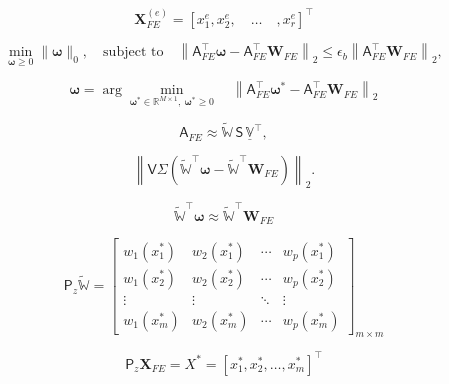 \documentclass[11pt]{article}
\renewcommand{\vec}[1]{\mathbf{#1}}
\newcommand{\mat}[1]{\mathsf{#1}}
\begin{document}
\begin{equation}
\vec{X}_{FE}^{(e)} = \left[ x_1^e, x_2^e, \quad\hdots\quad, x_r^e \right]^\top
\end{equation}

\begin{equation}
\min_{\boldsymbol{\omega} \geq 0} \| \boldsymbol{\omega} \|_0, \quad \text{subject to} \quad \left\| \mat{A}_{FE}^\top \boldsymbol{\omega} - \mat{A}_{FE}^\top \vec{W}_{FE} \right\|_2 \leq \epsilon_b \left\| \mat{A}_{FE}^\top \vec{W}_{FE} \right\|_2,
\label{eq:ecm_opt2}
\end{equation}

\begin{equation}
\boldsymbol{\omega} = \arg \min_{\boldsymbol{\omega^*} \in \mathbb{R}^{M\times 1},\ \boldsymbol{\omega^*} \geq 0} \quad \left\| \mat{A}_{FE}^\top \boldsymbol{\omega^*} - \mat{A}_{FE}^\top \vec{W}_{FE} \right\|_2 
\label{eq:alternative_min_ecm}
\end{equation}

\begin{equation}
\mat{A}_{FE} \approx \widetilde{\mathbb{W}}\, \mat{S}\, \underline{\mathbb{V}}^{\top},
\end{equation}

\begin{equation}
\left\| \mat{V} \mat{\Sigma} \left( \widetilde{\mathbb{W}}^{\top} \boldsymbol{\omega} - \widetilde{\mathbb{W}}^{\top} \vec{W}_{FE} \right) \right\|_2.
\label{eq:ecm_opt2_a}
\end{equation}

\begin{equation}
\widetilde{\mathbb{W}}^{\top} \boldsymbol{\omega} \approx \widetilde{\mathbb{W}}^{\top} \vec{W}_{FE}
\label{eq:ecm_opt3}
\end{equation}

\begin{equation}
\mat{P}_z \mathbb{\widetilde{W}} =
\begin{bmatrix}
w_1(x_1^*) & w_2(x_1^*) & \cdots & w_p(x_1^*) \\
w_1(x_2^*) & w_2(x_2^*) & \cdots & w_p(x_2^*) \\
\vdots & \vdots & \ddots & \vdots \\
w_1(x_m^*) & w_2(x_m^*) & \cdots & w_p(x_m^*)
\end{bmatrix}_{m \times m}
\end{equation}

\begin{equation}
\mat{P}_z \vec{X}_{FE} = X^* = [x_1^*, x_2^*, \ldots, x_m^*]^{\top}
\end{equation}
\end{document}
